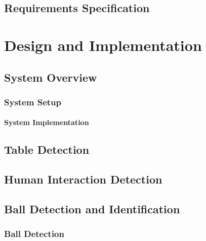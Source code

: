 	\chapter{Requirements Specification}
		\label{sec:reqspec}
		

\part{Design and Implementation}
	\label{solution}
	
	
	\chapter{System Overview}
		\label{sec:sysdesign}
		

		\section{System Setup}
			\label{sec:setup}
			
			
			\subsection{System Implementation}
				\label{sec:implementation}
				
		
	\chapter{Table Detection}
		\label{sec:table-locate}
			
		
		
	\chapter{Human Interaction Detection}
		\label{sec:shotdetection}
		

	\chapter{Ball Detection and Identification}
		\label{sec:balls-intro}	
			
		
			\section{Ball Detection}
				\label{sec:balls-locate}
				
		
